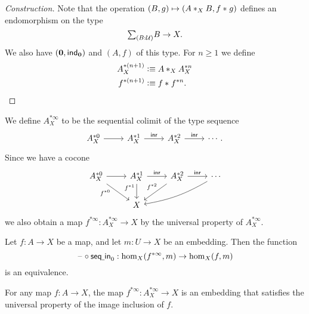 \begin{proof}[Construction]
Note that the operation $(B,g)\mapsto (\join[X]{A}{B},\join{f}{g})$ defines an endomorphism on the type
\begin{equation*}
\sm{B:\UU}B\to X.
\end{equation*}
We also have $(\emptyt,\ind{\emptyt})$ and $(A,f)$ of this type. For $n\geq 1$ we define
\begin{align*}
A_X^{\ast (n+1)} & \defeq \join[X]{A}{A_X^{\ast n}} \\
f^{\ast (n+1)} & \defeq \join{f}{f^{\ast n}}.\qedhere
\end{align*}
\end{proof}

\begin{defn}
We define $A_X^{\ast\infty}$ to be the sequential colimit of the type sequence
\begin{equation*}
\begin{tikzcd}
A_X^{\ast 0} \arrow[r] & A_X^{\ast 1} \arrow[r,"\inr"] & A_X^{\ast 2} \arrow[r,"\inr"] & \cdots.
\end{tikzcd}
\end{equation*}
Since we have a cocone
\begin{equation*}
\begin{tikzcd}
A_X^{\ast 0} \arrow[r] \arrow[dr,swap,"f^{\ast 0}" near start] & A_X^{\ast 1} \arrow[r,"\inr"] \arrow[d,swap,"f^{\ast 1}" near start] & A_X^{\ast 2} \arrow[r,"\inr"] \arrow[dl,swap,"f^{\ast 2}" xshift=1ex] & \cdots \arrow[dll,bend left=10] \\
& X
\end{tikzcd}
\end{equation*}
we also obtain a map $f^{\ast\infty}:A_X^{\ast\infty}\to X$ by the universal property of $A_X^{\ast\infty}$. 
\end{defn}

\begin{lem}\label{lem:finfjp_up}
Let $f:A\to X$ be a map, and let $m:U\to X$ be an embedding. Then the function
\begin{equation*}
\blank\circ \seqin_0: \mathrm{hom}_X(f^{\ast\infty},m)\to \mathrm{hom}_X(f,m)
\end{equation*}
is an equivalence. 
\end{lem}

\begin{thm}\label{lem:isprop_infjp}
For any map $f:A\to X$, the map $f^{\ast\infty}:A_X^{\ast\infty}\to X$ is an embedding that satisfies the universal property of the image inclusion of $f$.
\end{thm}

